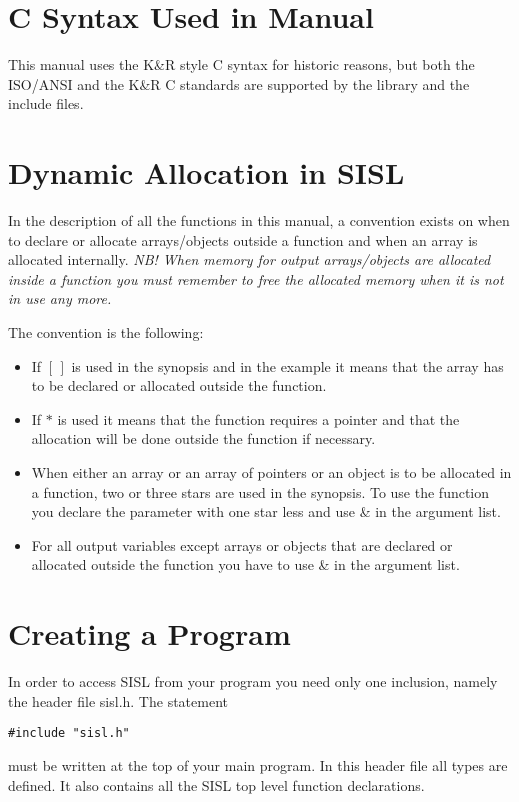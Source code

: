 
\section{\label{syntax}C Syntax Used in Manual}
This manual uses the K\&R style C syntax for historic reasons, but both
the ISO/ANSI and the K\&R C standards are supported by the library and
the include files.

\section{\label{dynamic}Dynamic Allocation in SISL}
In the description of all the functions in this manual, a
convention exists on when to declare or allocate arrays/objects outside a
function and when an array is allocated internally.
{\em NB! When memory for output arrays/objects are allocated inside a function you
must remember to free the allocated memory when it is not in use any
more.}

The convention is the following:
\begin{itemize}
\item If $[\,]$ is used in the synopsis and in the example it means
that the array has to be declared or allocated outside the function.
\item If $*$ is used it means that the function requires a
pointer and that the allocation will be done outside the function if necessary.
\item When either an array or an array of pointers or an object is to be
allocated in a function, two or three stars are used in the
synopsis.
To use the function you declare the parameter with one star less and use  \&
in the argument list.
\item For all output variables except arrays or objects
that are declared or allocated  outside the function you have to use \&
in the argument list.
\end{itemize}


\vfill
\newpage
\section{Creating a Program}

In order to access SISL from your program you need only one inclusion, namely
the header file sisl.h. The statement
\begin{verbatim}
#include "sisl.h"
\end{verbatim}
must be written at the top of your main program.
In this header file all types
are defined.
It also contains all the
SISL top level function declarations.


